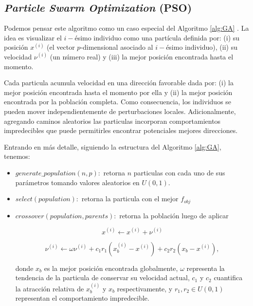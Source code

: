 \subsection{\emph{Particle Swarm Optimization} (PSO)}

Podemos pensar este algoritmo como un caso especial del Algoritmo \ref{alg:GA}
\citep{Mykel2019, Prosopio-Galarza2019}.
La idea es visualizar el $i-$ésimo individuo como una partícula definida por: 
(i) su posición $x^{(i)}$ (el vector $p$-dimensional asociado al $i-$ésimo individuo),
(ii) su velocidad $\nu^{(i)}$ (un número real) y
(iii) la mejor posición encontrada hasta el momento.

Cada particula acumula velocidad en una dirección favorable dada por: 
(i) la mejor posición encontrada hasta el momento por ella y 
(ii) la mejor posición encontrada por la población completa.
Como consecuencia, los individuos se pueden mover independientemente de
perturbaciones locales.
Adicionalmente, agregando caminos aleatorios las particulas incorporan
comportamientos impredecibles que puede permitirles encontrar potenciales
mejores direcciones.

Entrando en más detalle, siguiendo la estructura del Algoritmo \ref{alg:GA}, tenemos:

\begin{itemize}

\item $generate\_population(n, p):$ retorna $n$ particulas con cada uno de
      sus parámetros tomando valores aleatorios en $U(0, 1)$.

\item $select(population):$ retorna la particula con el mejor $f_{obj}$

\item $crossover(population, parents):$ retorna la población luego de aplicar 
    
  \begin{equation}
    x^{(i)} \gets x^{(i)} + \nu^{(i)}
  \label{pso-pos}
  \end{equation}

  \begin{equation}
    \nu^{(i)} \gets \omega \nu^{(i)} + c_1 r_1 \left(x_{b}^{(i)} - x^{(i)}
    \right) + c_2 r_2 \left(x_{b} - x^{(i)} \right),
  \label{pso-speed}
  \end{equation}
    

  donde $x_{b}$  es la mejor posición encontrada globalmente, 
  $\omega$ representa la tendencia de la particula de conservar su velocidad actual,
  $c_1$ y $c_2$ cuantifica la atracción relativa de $x_{b}^{(i)}$ y $x_{b}$ respectivamente, 
  y $r_1, r_2 \in U(0, 1)$ representan el comportamiento impredecible.

\end{itemize}



